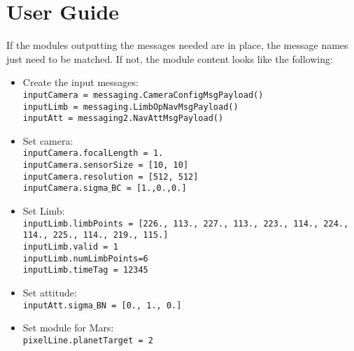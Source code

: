 
\section{User Guide}
If the modules outputting the messages needed are in place, the message names just need to be matched. If not, the module content looks like the following:

\begin{itemize}
\item Create the input messages: \\
\texttt{inputCamera = messaging.CameraConfigMsgPayload()} \\
\texttt{inputLimb = messaging.LimbOpNavMsgPayload()}\\
\texttt{inputAtt = messaging2.NavAttMsgPayload()}\\
\item Set camera: \\
\texttt{inputCamera.focalLength = 1.}\\
\texttt{inputCamera.sensorSize = [10, 10]}\\
\texttt{inputCamera.resolution = [512, 512]}\\
\texttt{inputCamera.sigma$\_$BC = [1.,0.,0.]}\\
\item Set Limb: \\
\texttt{inputLimb.limbPoints = [226., 113., 227., 113., 223., 114., 224., 114., 225., 114., 219.,
       115.]}\\
\texttt{inputLimb.valid = 1}\\
\texttt{inputLimb.numLimbPoints=6}\\
\texttt{inputLimb.timeTag = 12345}\\
\item Set attitude: \\
\texttt{inputAtt.sigma$\_$BN = [0., 1., 0.]}\\
\item Set module for Mars: \\
\texttt{pixelLine.planetTarget = 2}\\
  \end{itemize}